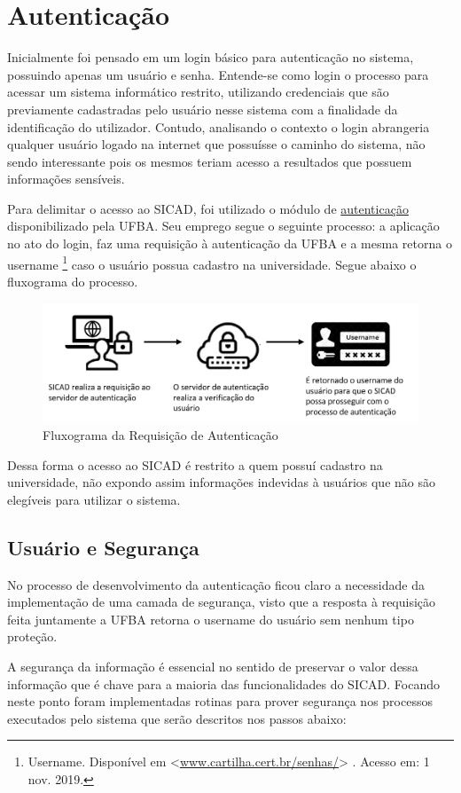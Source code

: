 \documentclass[12pt, a4paper]{report}
\begin{document}
\section{ Autenticação}
\par Inicialmente foi pensado em um login básico para autenticação no sistema, possuindo apenas um usuário e senha. Entende-se como login o processo para acessar um sistema informático restrito, utilizando credenciais que são previamente cadastradas pelo usuário nesse sistema com a finalidade da identificação do utilizador. Contudo, analisando o contexto o login abrangeria qualquer usuário logado na internet que possuísse o caminho do sistema, não sendo interessante pois os mesmos teriam acesso a resultados que possuem informações sensíveis.
\par Para delimitar o acesso ao SICAD, foi utilizado o módulo de \href{https://www.autenticacao.ufba.br}{autenticação} disponibilizado pela UFBA. Seu emprego segue o seguinte processo: a aplicação no ato do login, faz uma requisição à autenticação da UFBA e a mesma retorna o username \footnote{Username. Disponível em <\url{www.cartilha.cert.br/senhas/}> . Acesso em: 1 nov. 2019.} caso o usuário possua cadastro na universidade. Segue abaixo o fluxograma do processo.
\begin{figure}[!ht]
\centering
\includegraphics[scale=0.50]{processo_autenticacao.jpg}
\caption{Fluxograma da Requisição de Autenticação}
\label{fig:processo_autenticacao}
\end{figure}

\par Dessa forma o acesso ao SICAD é restrito a quem possuí cadastro na universidade, não expondo assim informações indevidas à usuários que não são elegíveis para utilizar o sistema.

\subsection{Usuário e Segurança}
\par No processo de desenvolvimento da autenticação ficou claro a necessidade da implementação de uma camada de segurança, visto que a resposta à requisição feita juntamente a UFBA retorna o username do usuário sem nenhum tipo proteção.
\par A segurança da informação é essencial no sentido de preservar o valor dessa informação que é chave para a maioria das funcionalidades do SICAD. Focando neste ponto foram implementadas rotinas para prover segurança nos processos executados pelo sistema que serão descritos nos passos abaixo:
\end{document}
